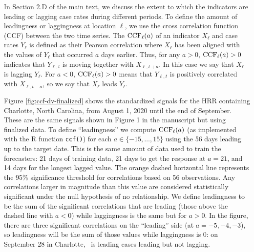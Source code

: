 In Section 2.D of the main text, we discuss the extent to which the indicators
are leading or lagging case rates during different periods. To define the amount
of leadingness or laggingness at location $\ell$, we use the cross correlation
function (CCF) 
between the two time series. The $\mathrm{CCF}_\ell(a)$ of an indicator $X_{\ell}$ and case
rates $Y_{\ell}$ is defined as
their Pearson correlation where $X_\ell$ has been
aligned
with the values of $Y_{\ell}$ that occurred $a$ days earlier.
Thus, for any $a>0$, $\mathrm{CCF}_{\ell}(a)>0$ indicates that
$Y_{\ell,t}$ is moving together with $X_{\ell,t+a}$.
In this case we say that $X_{\ell}$ is lagging
$Y_{\ell}$. For $a<0$, $\mathrm{CCF}_{\ell}(a)>0$ means that $Y_{\ell,t}$ is
positively correlated with $X_{\ell,t-a}$, so we say that
$X_{\ell}$ leads $Y_{\ell}$.

Figure \ref{fig:ccf-dv-finalized} shows the standardized signals for the HRR
containing Charlotte, North Carolina, from August 1, 2020 until the end of
September. These are the same signals shown in Figure 1 in the manuscript but
using finalized data. To
define ``leadingness'' we compute $\mathrm{CCF}_{\ell}(a)$ (as implemented with the R
function {\tt ccf()}) for each $a\in
\{-15,\ldots,15\}$ using the 56 days leading up to the target date. This is the same
amount of data used to train the forecasters: 21 days of training data, 21 days
to get the response at $a=21$, and 14 days for the longest lagged value. The
orange dashed horizontal line represents the 95\% significance threshold for
correlations based on 56 observations. Any correlations larger in magnitude than
this value are considered statistically significant under the null hypothesis of
no relationship. We define leadingness to be the sum of the significant
correlations that are leading (those above the dashed line with $a<0$) while
laggingness is the same but for $a>0$. In the figure, there are three
significant correlations on the ``leading'' side (at $a = -5, -4, -3$), so
leadingness will be the sum of those values while laggingness is 0:
on September 28 in Charlotte, \dv~is leading cases
leading but not lagging.

